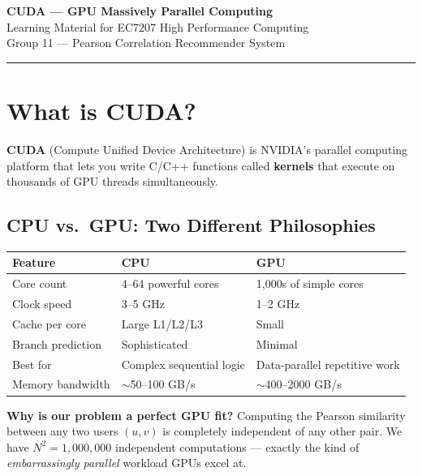 \documentclass[12pt,a4paper]{article}
\begin{document}

\begin{center}
    {\LARGE\bfseries CUDA — GPU Massively Parallel Computing}\\[0.5em]
    {\large Learning Material for EC7207 High Performance Computing}\\[0.3em]
    {\normalsize Group 11 — Pearson Correlation Recommender System}
\end{center}
\vspace{1em}\hrule\vspace{1.5em}

\section{What is CUDA?}

\textbf{CUDA} (Compute Unified Device Architecture) is NVIDIA's parallel
computing platform that lets you write C/C++ functions called \textbf{kernels}
that execute on thousands of GPU threads simultaneously.

\subsection{CPU vs.\ GPU: Two Different Philosophies}

\begin{center}
\begin{tabular}{lll}
\toprule
Feature & CPU & GPU \\
\midrule
Core count & 4--64 powerful cores & 1,000s of simple cores \\
Clock speed & 3--5 GHz & 1--2 GHz \\
Cache per core & Large L1/L2/L3 & Small \\
Branch prediction & Sophisticated & Minimal \\
Best for & Complex sequential logic & Data-parallel repetitive work \\
Memory bandwidth & $\sim$50--100 GB/s & $\sim$400--2000 GB/s \\
\bottomrule
\end{tabular}
\end{center}

\textbf{Why is our problem a perfect GPU fit?}  Computing the Pearson
similarity between any two users $(u,v)$ is completely independent of any
other pair.  We have $N^2 = 1{,}000{,}000$ independent computations —
exactly the kind of \emph{embarrassingly parallel} workload GPUs excel at.
\end{document}
